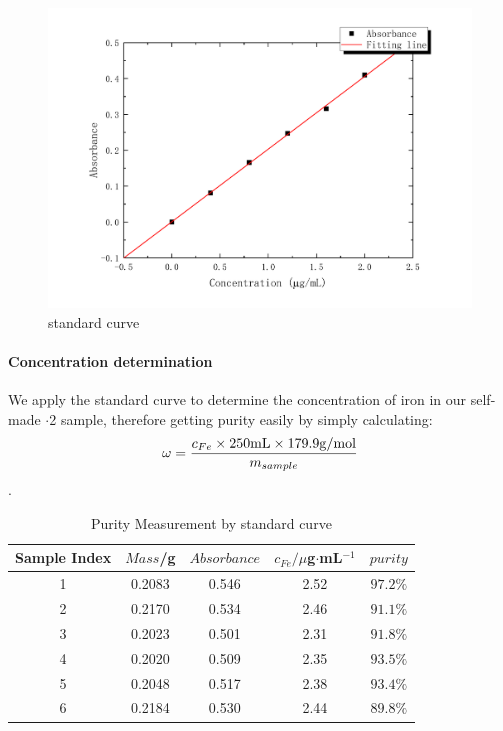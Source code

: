 \begin{figure}[H]
	\includegraphics[width=\linewidth]{Fig1.pdf}
	\caption{standard curve}
	\label{fig1}
\end{figure}

\paragraph{Concentration determination}
We apply the standard curve to determine the concentration of iron in our self-made $\cdot$2 sample, therefore getting purity easily by simply calculating: \[\omega=\frac{c_{Fe}\times250{\rm mL}\times179.9{\rm g/mol}}{m_{sample}}\].

\begin{table}[H]
	\caption{Purity Measurement by standard curve}
	\label{tab.Pcurve}
	\begin{tabular}{ccccc}
	\toprule
	Sample Index  &$Mass$/g & $Absorbance$ &$c_{Fe}/\mu$g$\cdot$mL$^{-1}$& $purity$   \\
	\midrule
	1		&0.2083 & 0.546      & 2.52   &$97.2\%$  \\
	2		&0.2170 & 0.534      & 2.46   &$91.1\%$  \\
	3		&0.2023 & 0.501      & 2.31   &$91.8\%$  \\
	4		&0.2020 & 0.509      & 2.35   &$93.5\%$  \\
	5		&0.2048 & 0.517      & 2.38   &$93.4\%$  \\
	6		&0.2184 & 0.530      & 2.44   &$89.8\%$  \\
	\bottomrule
	\end{tabular}
\end{table}

